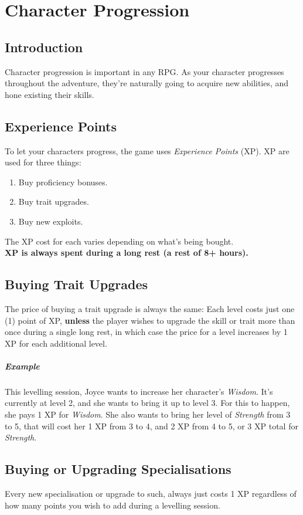 \chapter{Character Progression}\label{chap:char-prog}
\section{Introduction}
Character progression is important in any RPG.
As your character progresses throughout the adventure, they're naturally going to acquire new abilities, and hone existing their skills.

\section{Experience Points}
To let your characters progress, the game uses \textit{Experience Points} (XP).
XP are used for three things:
\begin{enumerate}
\item Buy proficiency bonuses.
\item Buy trait upgrades.
\item Buy new exploits.
\end{enumerate}
The XP cost for each varies depending on what's being bought.\\
\textbf{XP is always spent during a long rest (a rest of 8+ hours).}

\section{Buying Trait Upgrades}
The price of buying a trait upgrade is always the same:
Each level costs just one (1) point of XP, \textbf{unless} the player wishes to upgrade the skill or trait more than once during a single long rest, in which case the price for a level increases by 1 XP for each additional level.

\paragraph{Example} This levelling session, Joyce wants to increase her character's \textit{Wisdom}. 
It's currently at level 2, and she wants to bring it up to level 3.
For this to happen, she pays 1 XP for \textit{Wisdom}.
She also wants to bring her level of \textit{Strength} from 3 to 5, that will cost her 1 XP from 3 to 4, and 2 XP from 4 to 5, or 3 XP total for \textit{Strength}.

\section{Buying or Upgrading Specialisations}
Every new specialisation or upgrade to such, always just costs 1 XP regardless of how many points you wish to add during a levelling session.

